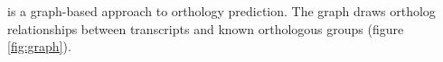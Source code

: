 \pname is a graph-based approach to orthology prediction. The graph draws
ortholog relationships between transcripts and known orthologous groups (figure
\ref{fig:graph}).



